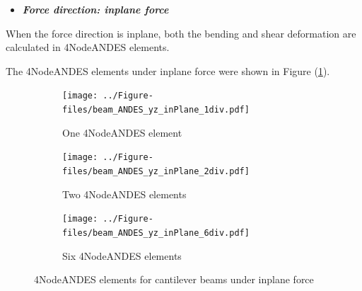 \documentclass[fleqn,11pt]{article}
\begin{document}

\begin{itemize}
  \item \textbf{\emph{Force direction: inplane force }}
\end{itemize}
When the force direction is inplane, both the bending and shear deformation are calculated in 4NodeANDES elements. 


The 4NodeANDES elements under inplane force were shown in Figure (\ref{fig 4NodeANDES elements for cantilever beams under inplane force}).

\begin{figure}[H]
  \centering
  \begin{subfigure}{0.5\textwidth}
    \centering
    \texttt{[image: ../Figure-files/beam\_ANDES\_yz\_inPlane\_1div.pdf]}
    \caption{One 4NodeANDES element}
  \end{subfigure}
  \vskip 8pt
  \begin{subfigure}{0.5\textwidth}
    \centering
    \texttt{[image: ../Figure-files/beam\_ANDES\_yz\_inPlane\_2div.pdf]}
    \caption{Two 4NodeANDES elements}
  \end{subfigure}
  \vskip 8pt
  \begin{subfigure}{0.5\textwidth}
    \centering
    \texttt{[image: ../Figure-files/beam\_ANDES\_yz\_inPlane\_6div.pdf]}
    \caption{Six 4NodeANDES elements}
  \end{subfigure}
  \captionsetup{justification=centering,margin=3cm}
  \caption{4NodeANDES elements for cantilever beams under inplane force}
  \label{fig 4NodeANDES elements for cantilever beams under inplane force}
\end{figure}




\end{document}
